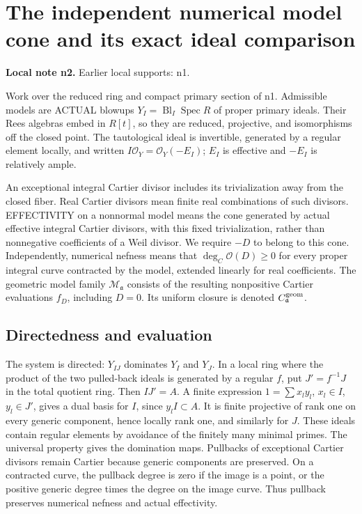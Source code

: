 \documentclass[11pt]{article}
\begin{document}
\section{The independent numerical model cone and its exact ideal comparison}
\label{sec:n2}
\noindent\textbf{Local note n2.} Earlier local supports: n1.

Work over the reduced ring and compact primary section of n1. Admissible models are ACTUAL blowups $Y_I=\operatorname{Bl}_I\operatorname{Spec}R$ of proper primary ideals. Their Rees algebras embed in $R[t]$, so they are reduced, projective, and isomorphisms off the closed point. The tautological ideal is invertible, generated by a regular element locally, and written $I\mathcal O_Y=\mathcal O_Y(-E_I)$; $E_I$ is effective and $-E_I$ is relatively ample.

An exceptional integral Cartier divisor includes its trivialization away from the closed fiber. Real Cartier divisors mean finite real combinations of such divisors. EFFECTIVITY on a nonnormal model means the cone generated by actual effective integral Cartier divisors, with this fixed trivialization, rather than nonnegative coefficients of a Weil divisor. We require $-D$ to belong to this cone. Independently, numerical nefness means that $\deg_C\mathcal O(D)\ge0$ for every proper integral curve contracted by the model, extended linearly for real coefficients. The geometric model family $\mathcal M_{\mathfrak a}$ consists of the resulting nonpositive Cartier evaluations $f_D$, including $D=0$. Its uniform closure is denoted $C_{\mathfrak a}^{\rm geom}$.

\subsection{Directedness and evaluation}

The system is directed: $Y_{IJ}$ dominates $Y_I$ and $Y_J$. In a local ring where the product of the two pulled-back ideals is generated by a regular $f$, put $J'=f^{-1}J$ in the total quotient ring. Then $IJ'=A$. A finite expression $1=\sum x_l y_l$, $x_l\in I$, $y_l\in J'$, gives a dual basis for $I$, since $y_l I\subset A$. It is finite projective of rank one on every generic component, hence locally rank one, and similarly for $J$. These ideals contain regular elements by avoidance of the finitely many minimal primes. The universal property gives the domination maps. Pullbacks of exceptional Cartier divisors remain Cartier because generic components are preserved. On a contracted curve, the pullback degree is zero if the image is a point, or the positive generic degree times the degree on the image curve. Thus pullback preserves numerical nefness and actual effectivity.
\end{document}
